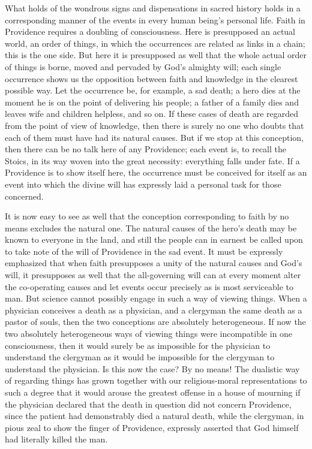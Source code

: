 \documentclass[12pt]{book}
\newcommand{\opage}[1]{\marginnote{\footnotesize\textit{[#1]}}}
\begin{document}
What holds of the wondrous signs and dispensations in sacred history
holds in a corresponding manner of the events in every human being's
personal life. Faith in Providence requires a doubling of consciousness.
Here is presupposed an actual world, an order of things, in which the
occurrences are related as links in a chain; this is the one side. But
here it is presupposed as well that the whole actual order of things is
borne, moved and pervaded by God's almighty will; each single occurrence
shows us the opposition between faith and knowledge in the clearest
possible way. Let the occurrence be, for example, a sad death; a hero
dies at the moment he is on the point of delivering his people; a father
of a family dies and leaves wife and children
\opage{218}\setcounter{footnote}{0}%
helpless, and so on. If these cases of death are regarded from the
point of view of knowledge, then there is surely no one who doubts that
each of them must have had its natural causes. But if we stop at this
conception, then there can be no talk here of any Providence; each
event is, to recall the Stoics, in its way woven into the great
necessity: everything falls under fate. If a Providence is to show
itself here, the occurrence must be conceived for itself as an event
into which the divine will has expressly laid a personal task for those
concerned.

It is now easy to see as well that the conception corresponding to
faith by no means excludes the natural one. The natural causes of the
hero's death may be known to everyone in the land, and still the people
can in earnest be called upon to take note of the will of Providence in
the sad event. It must be expressly emphasized that when faith
presupposes a unity of the natural causes and God's will, it presupposes
as well that the all-governing will can at every moment alter the
co-operating causes and let events occur precisely as is most
serviceable to man. But science cannot possibly engage in such a way of
viewing things. When a physician conceives a death as a physician, and
a clergyman the same death as a pastor of souls, then the two
conceptions are absolutely heterogeneous. If now the two absolutely
heterogeneous ways of viewing things were incompatible in one
consciousness, then it would surely be as impossible for the physician
to understand the clergyman as it would be impossible for the clergyman
to understand the physician. Is this now the case? By no means! The
dualistic way of regarding things has grown together with our
religious-moral representations to such a degree that it would arouse
the greatest offense in a house of mourning if the physician declared
that the death in question
\opage{219}\setcounter{footnote}{0}%
did not concern Providence, since the patient had demonstrably died a
natural death, while the clergyman, in pious zeal to show the finger of
Providence, expressly asserted that God himself had literally killed the
man.
\end{document}
